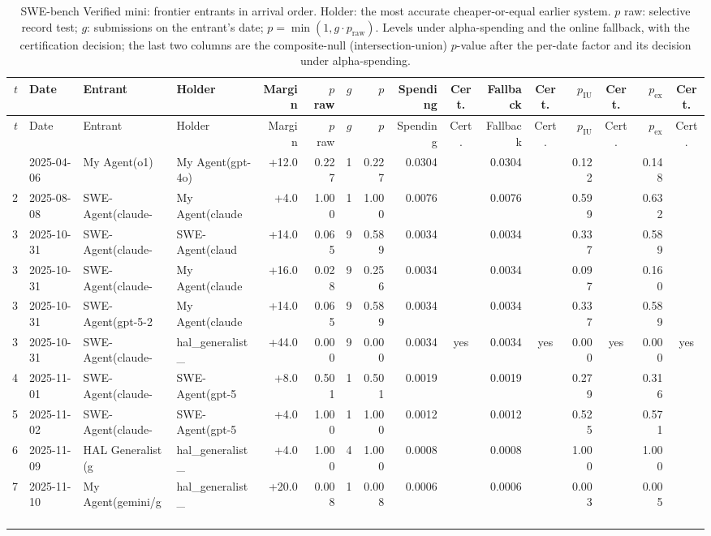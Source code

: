 {\begin{longtable}{rlllrrrrrcrcrcrc}
\caption{SWE-bench Verified mini: frontier entrants in arrival order. Holder: the most accurate cheaper-or-equal earlier system. $p$ raw: selective record test; $g$: submissions on the entrant's date; $p = \min(1, g \cdot p_{\mathrm{raw}})$. Levels under alpha-spending and the online fallback, with the certification decision; the last two columns are the composite-null (intersection-union) $p$-value after the per-date factor and its decision under alpha-spending.}\label{tab:supp-cert-hal_swebench_verified_mini}\\
\toprule
$t$ & Date & Entrant & Holder & Margin & $p$ raw & $g$ & $p$ & Spending & Cert. & Fallback & Cert. & $p_{\mathrm{IU}}$ & Cert. & $p_{\mathrm{ex}}$ & Cert. \\
\midrule
\endfirsthead
\toprule
$t$ & Date & Entrant & Holder & Margin & $p$ raw & $g$ & $p$ & Spending & Cert. & Fallback & Cert. & $p_{\mathrm{IU}}$ & Cert. & $p_{\mathrm{ex}}$ & Cert. \\
\midrule
\endhead
\bottomrule
\endfoot
1 & 2025-04-06 & My Agent(o1) & My Agent(gpt-4o) & +12.0 & 0.227 & 1 & 0.227 & 0.0304 &  & 0.0304 &  & 0.122 &  & 0.148 &  \\
2 & 2025-08-08 & SWE-Agent(claude-~ & My Agent(claude~ & +4.0 & 1.000 & 1 & 1.000 & 0.0076 &  & 0.0076 &  & 0.599 &  & 0.632 &  \\
3 & 2025-10-31 & SWE-Agent(claude-~ & SWE-Agent(claud~ & +14.0 & 0.065 & 9 & 0.589 & 0.0034 &  & 0.0034 &  & 0.337 &  & 0.589 &  \\
3 & 2025-10-31 & SWE-Agent(claude-~ & My Agent(claude~ & +16.0 & 0.028 & 9 & 0.256 & 0.0034 &  & 0.0034 &  & 0.097 &  & 0.160 &  \\
3 & 2025-10-31 & SWE-Agent(gpt-5-2~ & My Agent(claude~ & +14.0 & 0.065 & 9 & 0.589 & 0.0034 &  & 0.0034 &  & 0.337 &  & 0.589 &  \\
3 & 2025-10-31 & SWE-Agent(claude-~ & hal\_generalist\_~ & +44.0 & 0.000 & 9 & 0.000 & 0.0034 & yes & 0.0034 & yes & 0.000 & yes & 0.000 & yes \\
4 & 2025-11-01 & SWE-Agent(claude-~ & SWE-Agent(gpt-5~ & +8.0 & 0.501 & 1 & 0.501 & 0.0019 &  & 0.0019 &  & 0.279 &  & 0.316 &  \\
5 & 2025-11-02 & SWE-Agent(claude-~ & SWE-Agent(gpt-5~ & +4.0 & 1.000 & 1 & 1.000 & 0.0012 &  & 0.0012 &  & 0.525 &  & 0.571 &  \\
6 & 2025-11-09 & HAL Generalist (g~ & hal\_generalist\_~ & +4.0 & 1.000 & 4 & 1.000 & 0.0008 &  & 0.0008 &  & 1.000 &  & 1.000 &  \\
7 & 2025-11-10 & My Agent(gemini/g~ & hal\_generalist\_~ & +20.0 & 0.008 & 1 & 0.008 & 0.0006 &  & 0.0006 &  & 0.003 &  & 0.005 &  \\
\end{longtable}

}
